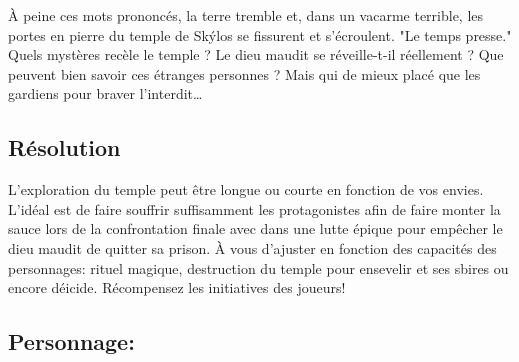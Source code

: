 À peine ces mots prononcés, la terre tremble et, dans un vacarme terrible, les portes en pierre du temple de Skýlos se fissurent et s'écroulent. "Le temps presse." Quels mystères recèle le temple ? Le dieu maudit se réveille-t-il réellement ? Que peuvent bien savoir ces étranges personnes ? Mais qui de mieux placé que les gardiens pour braver l'interdit\dots

\subsection{Résolution}

L'exploration du temple peut être longue ou courte en fonction de vos envies.
L'idéal est de faire souffrir suffisamment les protagonistes afin de faire monter la sauce lors de la confrontation finale avec \skylos dans une lutte épique pour empêcher le dieu maudit de quitter sa prison.
À vous d'ajuster en fonction des capacités des personnages: rituel magique, destruction du temple pour ensevelir \skylos et ses sbires ou encore déicide.
Récompensez les initiatives des joueurs!

\subsection*{Personnage: \skylos}

\vfill
{}
\vfill
